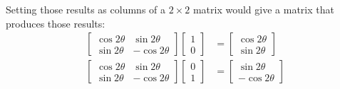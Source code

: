 \documentclass[letterpaper,12pt]{report}
\begin{document}
Setting those results as columns of a $2 \times 2$ matrix would give a matrix that produces those results:
\begin{align*}
  \begin{bmatrix}
    \cos{2\theta} & \sin{2\theta} \\
    \sin{2\theta} & -\cos{2\theta}
  \end{bmatrix}
  \begin{bmatrix}
    1 \\ 0
  \end{bmatrix} &=
  \begin{bmatrix}
    \cos{2\theta} \\ \sin{2\theta}
  \end{bmatrix} \\
  \begin{bmatrix}
    \cos{2\theta} & \sin{2\theta} \\
    \sin{2\theta} & -\cos{2\theta}
  \end{bmatrix}
  \begin{bmatrix}
    0 \\ 1
  \end{bmatrix} &=
  \begin{bmatrix}
    \sin{2\theta} \\ -\cos{2\theta}
  \end{bmatrix}
\end{align*}
\end{document}
